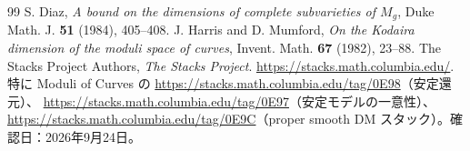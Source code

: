 \documentclass[dvipdfmx,a4paper,11pt]{article}
\theoremstyle{definition}
\begin{document}
\begin{thebibliography}{99}
 S. Diaz, \emph{A bound on the dimensions of complete subvarieties of $M_g$}, Duke Math. J. \textbf{51} (1984), 405--408.
 J. Harris and D. Mumford, \emph{On the Kodaira dimension of the moduli space of curves}, Invent. Math. \textbf{67} (1982), 23--88.
 The Stacks Project Authors, \emph{The Stacks Project}.\newline
\url{https://stacks.math.columbia.edu/}. 特に Moduli of Curves の\newline
\url{https://stacks.math.columbia.edu/tag/0E98}（安定還元）、\newline
\url{https://stacks.math.columbia.edu/tag/0E97}（安定モデルの一意性）、\newline
\url{https://stacks.math.columbia.edu/tag/0E9C}（proper smooth DM スタック）。確認日：2026年9月24日。
\end{thebibliography}
\endgroup
\end{document}
